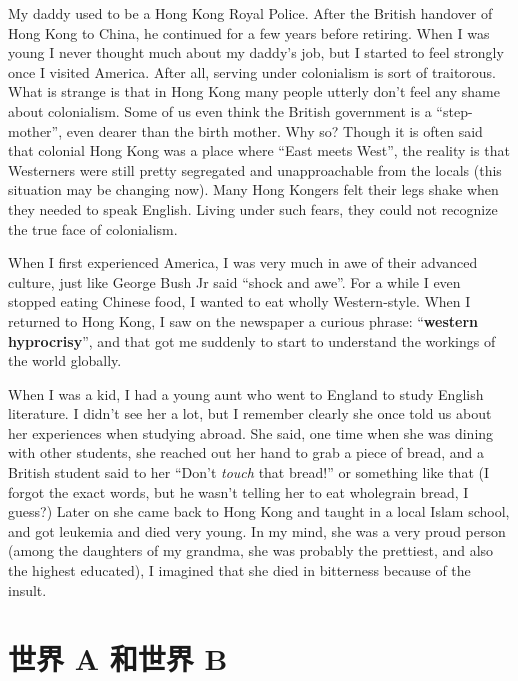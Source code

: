 \documentclass[12pt]{report}
\newcommand{\cc}[2]{#1}
\newcommand{\cc}[2]{#2}
\begin{document}
{
My daddy used to be a Hong Kong Royal Police.  After the British handover of Hong Kong to China, he continued for a few years before retiring.  When I was young I never thought much about my daddy's job, but I started to feel strongly once I visited America.  After all, serving under colonialism is sort of traitorous.  What is strange is that in Hong Kong many people utterly don't feel any shame about colonialism.  Some of us even think the British government is a ``step-mother'', even dearer than the birth mother.  Why so?  Though it is often said that colonial Hong Kong was a place where ``East meets West'', the reality is that Westerners were still pretty segregated and unapproachable from the locals (this situation may be changing now). Many Hong Kongers felt their legs shake when they needed to speak English.  Living under such fears, they could not recognize the true face of colonialism.

When I first experienced America, I was very much in awe of their advanced culture, just like George Bush Jr said ``shock and awe''.  For a while I even stopped eating Chinese food, I wanted to eat wholly Western-style.  When I returned to Hong Kong, I saw on the newspaper a curious phrase: ``\textbf{western hyprocrisy}'', and that got me suddenly to start to understand the workings of the world globally.

When I was a kid, I had a young aunt who went to England to study English literature.  I didn't see her a lot, but I remember clearly she once told us about her experiences when studying abroad.  She said, one time when she was dining with other students, she reached out her hand to grab a piece of bread, and a British student said to her ``Don't \textit{touch} that bread!'' or something like that (I forgot the exact words, but he wasn't telling her to eat wholegrain bread, I guess?)  Later on she came back to Hong Kong and taught in a local Islam school, and got leukemia and died very young.  In my mind, she was a very proud person (among the daughters of my grandma, she was probably the prettiest, and also the highest educated), I imagined that she died in bitterness because of the insult.
}

\chapter{\cc{世界 A 和世界 B}{World A and world B}}
\end{document}
